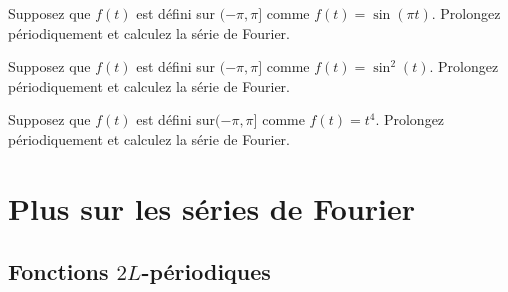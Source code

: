 \begin{exercise}
Supposez que $f(t)$ est défini sur $(-\pi,\pi]$ comme $f(t) = \sin(\pi t)$.  Prolongez périodiquement et calculez la série de Fourier.
\end{exercise}

\begin{exercise}
Supposez que $f(t)$ est défini sur $(-\pi,\pi]$ comme $f(t) = \sin^2(t)$.
Prolongez périodiquement et calculez la série de Fourier.
\end{exercise}

\begin{exercise}
Supposez que $f(t)$ est défini sur$(-\pi,\pi]$ comme $f(t) = t^4$.
Prolongez périodiquement et calculez la série de Fourier.
\end{exercise}


\sectionnewpage
\section{Plus sur les séries de Fourier}
\label{moreonfourier:section}
%


\subsection{Fonctions $2L$-périodiques}

